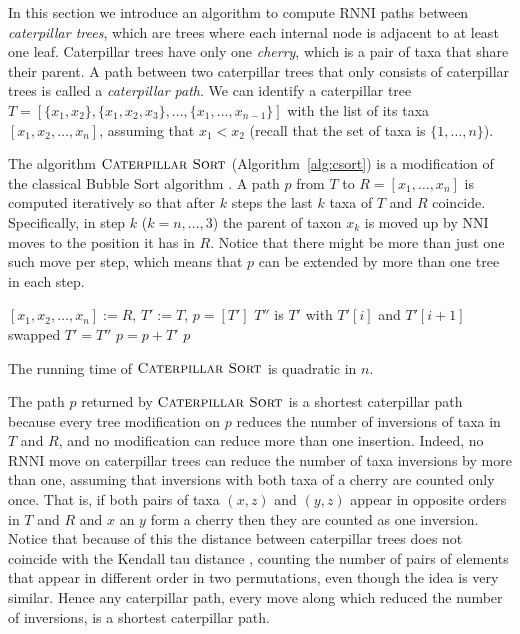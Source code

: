 \documentclass{amsart}
\newcommand{\nni}{\mathrm{NNI}}
\newcommand{\rnni}{\mathrm{RNNI}}
\newcommand{\csort}{\textsc{Caterpillar Sort}}
\begin{document}
In this section we introduce an algorithm to compute $\rnni$ paths between \emph{caterpillar trees}, which are trees where each internal node is adjacent to at least one leaf.
Caterpillar trees have only one \emph{cherry}, which is a pair of taxa that share their parent.
A path between two caterpillar trees that only consists of caterpillar trees is called a \emph{caterpillar path}.
We can identify a caterpillar tree $T = [\{x_1, x_2\}, \{x_1, x_2, x_3\}, \ldots, \{x_1, \ldots, x_{n-1}\}]$ with the list of its taxa $[x_1, x_2, \ldots, x_n]$, assuming that $x_1 < x_2$ (recall that the set of taxa is $\{1, \ldots, n\}$).

The algorithm $\csort$ (Algorithm~\ref{alg:csort}) is a modification of the classical Bubble Sort algorithm \autocite{Knuth1997-pi}.
A path $p$ from $T$ to $R= [x_1, \ldots, x_n]$ is computed iteratively so that after $k$ steps the last $k$ taxa of $T$ and $R$ coincide.
Specifically, in step $k$ ($k = n, \ldots, 3$) the parent of taxon $x_{k}$ is moved up by $\nni$ moves to the position it has in $R$.
Notice that there might be more than just one such move per step, which means that $p$ can be extended by more than one tree in each step.

\begin{algorithm}[H]
\caption{$\csort$($T,R$)}
\label{alg:csort}
\begin{algorithmic}[1]
\STATE $[x_1, x_2, \ldots, x_n] := R$, $T' := T$, $p = [T']$
            \STATE $T''$ is $T'$ with $T'[i]$ and $T'[i+1]$ swapped
            \STATE $T' = T''$
            \STATE $p = p + T'$
        \ENDIF
    \ENDFOR
\ENDFOR
\RETURN $p$
\end{algorithmic}
\end{algorithm}

The running time of $\csort$ is quadratic in $n$.

The path $p$ returned by $\csort$ is a shortest caterpillar path because every tree modification on $p$ reduces the number of inversions of taxa in $T$ and $R$, and no modification can reduce more than one insertion.
Indeed, no $\rnni$ move on caterpillar trees can reduce the number of taxa inversions by more than one, assuming that inversions with both taxa of a cherry are counted only once.
That is, if both pairs of taxa $(x, z)$ and $(y, z)$ appear in opposite orders in $T$ and $R$ and $x$ an $y$ form a cherry then they are counted as one inversion.
Notice that because of this the distance between caterpillar trees does not coincide with the Kendall tau distance \autocite{Kendall1948-tx}, counting the number of pairs of elements that appear in different order in two permutations, even though the idea is very similar.
Hence any caterpillar path, every move along which reduced the number of inversions, is a shortest caterpillar path.
\end{document}
